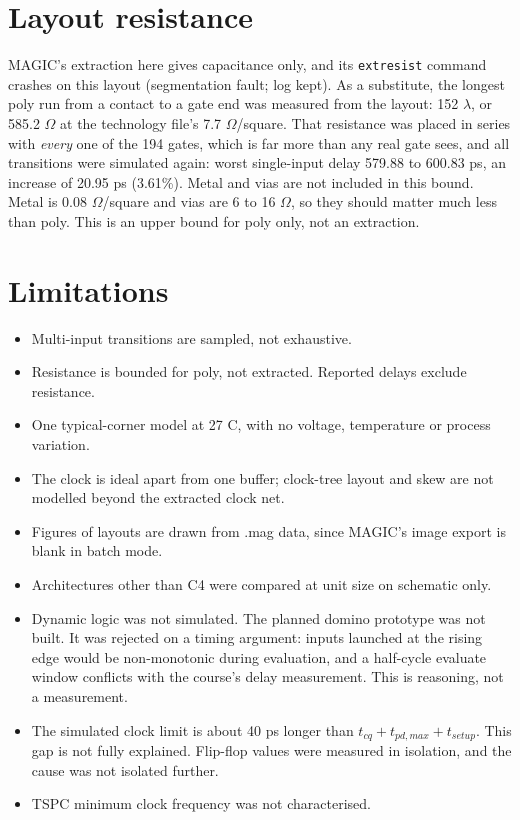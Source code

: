 \documentclass[10pt,a4paper]{article}
\begin{document}
\section{Layout resistance}\label{sec:res}
MAGIC's extraction here gives capacitance only, and its \texttt{extresist} command crashes on this layout (segmentation fault; log kept). As a substitute, the longest poly run from a contact to a gate end was measured from the layout: 152 $\lambda$, or 585.2 $\Omega$ at the technology file's 7.7 $\Omega$/square. That resistance was placed in series with \emph{every} one of the 194 gates, which is far more than any real gate sees, and all transitions were simulated again: worst single-input delay 579.88 to 600.83 ps, an increase of 20.95 ps (3.61\%). Metal and vias are not included in this bound. Metal is 0.08 $\Omega$/square and vias are 6 to 16 $\Omega$, so they should matter much less than poly. This is an upper bound for poly only, not an extraction.

\section{Limitations}
\begin{itemize}
\item Multi-input transitions are sampled, not exhaustive.
\item Resistance is bounded for poly, not extracted. Reported delays exclude resistance.
\item One typical-corner model at 27 C, with no voltage, temperature or process variation.
\item The clock is ideal apart from one buffer; clock-tree layout and skew are not modelled beyond the extracted clock net.
\item Figures of layouts are drawn from .mag data, since MAGIC's image export is blank in batch mode.
\item Architectures other than C4 were compared at unit size on schematic only.
\item Dynamic logic was not simulated. The planned domino prototype was not built. It was rejected on a timing argument: inputs launched at the rising edge would be non-monotonic during evaluation, and a half-cycle evaluate window conflicts with the course's delay measurement. This is reasoning, not a measurement.
\item The simulated clock limit is about 40 ps longer than $t_{cq}+t_{pd,max}+t_{setup}$. This gap is not fully explained. Flip-flop values were measured in isolation, and the cause was not isolated further.
\item TSPC minimum clock frequency was not characterised.
\end{itemize}
\end{document}
